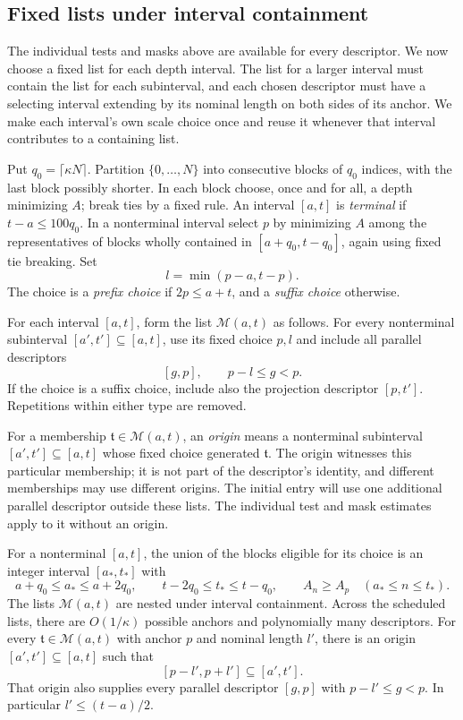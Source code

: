 \subsection{Fixed lists under interval containment}

The individual tests and masks above are available for every descriptor.
We now choose a fixed list for each depth interval. The list for a larger
interval must contain the list for each subinterval, and each chosen
descriptor must have a selecting interval extending by its nominal length
on both sides of its anchor. We make each interval's own scale choice once
and reuse it whenever that interval contributes to a containing list.

Put $q_0=\lceil\kappa N\rceil$. Partition $\{0,\ldots,N\}$ into
consecutive blocks of $q_0$ indices, with the last block possibly
shorter. In each block choose, once and for all, a depth minimizing
$A$; break ties by a fixed rule. An interval $[a,t]$ is
\emph{terminal} if $t-a\le100q_0$. In a nonterminal interval select
$p$ by minimizing $A$ among the representatives of blocks wholly
contained in $[a+q_0,t-q_0]$, again using fixed tie breaking. Set
\[
l=\min(p-a,t-p).
\]
The choice is a \emph{prefix choice} if $2p\le a+t$, and a
\emph{suffix choice} otherwise.

For each interval $[a,t]$, form the list $\mathcal M(a,t)$ as follows.
For every nonterminal subinterval $[a',t']\subseteq[a,t]$, use its
fixed choice $p,l$ and include all parallel descriptors
\[
[g,p],\qquad p-l\le g<p.
\]
If the choice is a suffix choice, include also the projection
descriptor $[p,t']$. Repetitions within either type are removed.

For a membership $\mathfrak t\in\mathcal M(a,t)$, an \emph{origin}
means a nonterminal subinterval $[a',t']\subseteq[a,t]$ whose fixed
choice generated $\mathfrak t$. The origin witnesses this particular
membership; it is not part of the descriptor's identity, and different
memberships may use different origins. The initial entry will use one
additional parallel descriptor outside these lists. The individual test
and mask estimates apply to it without an origin.

\begin{lemma}\label{test:descriptor-properties}
For a nonterminal $[a,t]$, the union of the blocks eligible for its
choice is an integer interval $[a_*,t_*]$ with
\[
a+q_0\le a_*\le a+2q_0,\qquad
t-2q_0\le t_*\le t-q_0,
\qquad A_n\ge A_p\quad(a_*\le n\le t_*).
\]
The lists $\mathcal M(a,t)$ are nested under interval containment.
Across the scheduled lists, there are $O(1/\kappa)$ possible anchors
and polynomially many descriptors. For every
$\mathfrak t\in\mathcal M(a,t)$ with anchor $p$ and nominal length $l'$,
there is an origin $[a',t']\subseteq[a,t]$ such that
\begin{equation}\label{test:descriptor-origin}
[p-l',p+l']\subseteq[a',t'].
\end{equation}
That origin also supplies every parallel descriptor $[g,p]$ with
$p-l'\le g<p$. In particular $l'\le(t-a)/2$.
\end{lemma}

